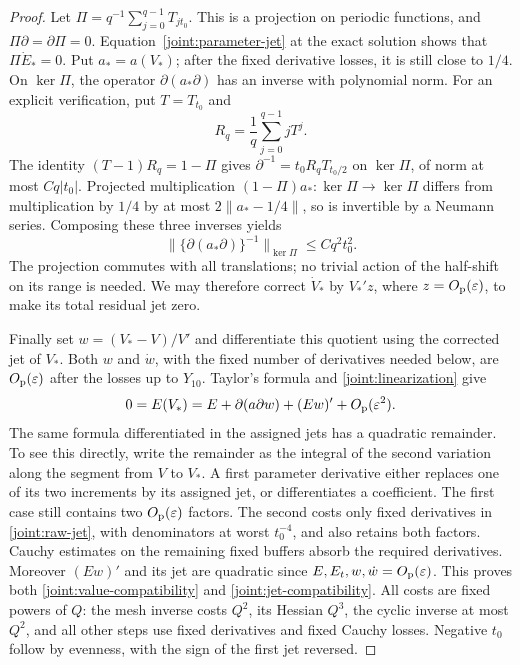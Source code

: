 \begin{proof}
Let \(\Pi=q^{-1}\sum_{j=0}^{q-1}T_{jt_0}\).  This is a projection
on periodic functions, and \(\Pi\partial=\partial\Pi=0\).
Equation~\eqref{joint:parameter-jet} at the exact solution shows that
\(\Pi\dot E_*=0\).  Put \(a_*=a(V_*)\); after the fixed derivative
losses, it is still close to \(1/4\).  On \(\ker\Pi\), the operator
\(\partial(a_*\partial)\) has an inverse with polynomial norm.  For
an explicit verification, put \(T=T_{t_0}\) and
\[
 R_q=\frac1q\sum_{j=0}^{q-1}jT^j.
\]
The identity \((T-1)R_q=1-\Pi\) gives
\(\partial^{-1}=t_0R_qT_{t_0/2}\) on \(\ker\Pi\), of norm at most
\(Cq|t_0|\).  Projected multiplication
\((1-\Pi)a_*:\ker\Pi\to\ker\Pi\) differs from multiplication by
\(1/4\) by at most \(2\|a_*-1/4\|\), so is invertible by a Neumann
series.  Composing these three inverses yields
\[
 \|\{\partial(a_*\partial)\}^{-1}\|_{\ker\Pi}
 \le Cq^2t_0^2.
\]
The projection commutes with all translations; no trivial action of the
half-shift on its range is needed.  We may therefore correct
\(\dot V_*\) by \(V_*'z\), where \(z=O_{\mathrm p}(\varepsilon)\), to
make its total residual jet zero.

Finally set \(w=(V_*-V)/V'\) and differentiate this quotient using the
corrected jet of \(V_*\).  Both \(w\) and \(\dot w\), with the fixed
number of derivatives needed below, are \(O_{\mathrm p}(\varepsilon)\) after
the losses up to \(Y_{10}\).  Taylor's formula and
\eqref{joint:linearization} give
\[
 0=E(V_*)=E+\partial(a\partial w)+(Ew)'
              +O_{\mathrm p}(\varepsilon^2).
\]
The same formula differentiated in the assigned jets has a quadratic
remainder.  To see this directly, write the remainder as the integral
of the second variation along the segment from \(V\) to \(V_*\).
A first parameter derivative either replaces one of its two increments
by its assigned jet, or differentiates a coefficient.  The first case
still contains two \(O_{\mathrm p}(\varepsilon)\) factors.  The second costs
only fixed derivatives in \eqref{joint:raw-jet}, with denominators at
worst \(t_0^{-4}\), and also retains both factors.  Cauchy estimates
on the remaining fixed buffers absorb the required derivatives.
Moreover \((Ew)'\) and its jet are quadratic since
\(E,E_t,w,\dot w=O_{\mathrm p}(\varepsilon)\).  This proves both
\eqref{joint:value-compatibility} and \eqref{joint:jet-compatibility}.
All costs are fixed powers of \(Q\): the mesh inverse costs \(Q^2\),
its Hessian \(Q^3\), the cyclic inverse at most \(Q^2\), and all other
steps use fixed derivatives and fixed Cauchy losses.  Negative \(t_0\)
follow by evenness, with the sign of the first jet reversed.
\end{proof}

